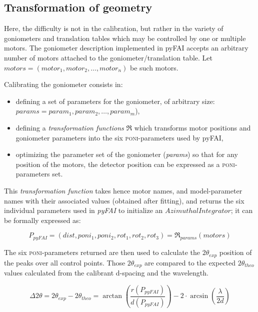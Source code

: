\documentclass[preprint]{iucr}              %
\begin{document}
\subsection{Transformation of geometry}

Here, the difficulty is not in the calibration, but rather in the
variety of goniometers and translation tables which may be controlled by one or 
multiple motors.
The goniometer description implemented in pyFAI accepts an
arbitrary number of motors attached to the goniometer/translation table. 
Let $motors = (motor_1, motor_2, \ldots, motor_n)$ be such motors. 

Calibrating the goniometer consists in:
\begin{itemize}
  \item defining a set of parameters for the goniometer, of arbitrary size:
  $params = param_1, param_2, \ldots, param_m$),
  \item defining a \textit{transformation functions} $\Re$ which transforms motor positions
  and goniometer parameters into the six \textsc{poni}-parameters used by
  pyFAI,
  \item optimizing the parameter set of the goniometer (\textit{params}) so that
  for any position of the motors, the detector position can be expressed as
  a \textsc{poni}-parameters set.
\end{itemize}

This \textit{transformation function} takes hence motor names, and model-parameter names 
with their associated values (obtained after fitting), and returns
the six individual parameters used in \textit{pyFAI} to initialize an $AzimuthalIntegrator$; it can be formally
expressed as:

\begin{equation}
P_{pyFAI} = (dist, poni_1, poni_2, rot_1, rot_2, rot_3) = \Re_{params}(motors)
\end{equation}


The six \textsc{poni}-parameters returned 
are then used to
calculate the $2\theta_{exp}$ position of the peaks over all control
points.
Those $2\theta_{exp}$ are compared to
the expected $2\theta_{theo}$ values calculated from the calibrant d-spacing and
the wavelength.

$$
\Delta 2\theta = 2\theta _{exp} - 2\theta _{theo} =
\arctan(\frac{r(P_{pyFAI})}{d(P_{pyFAI})}) -  2 \cdot
\arcsin(\frac{\lambda}{2d})
$$
\end{document}
